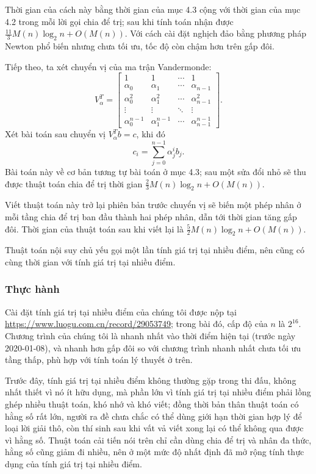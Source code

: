 \documentclass[11pt]{article}
\begin{document}
Thời gian của cách này bằng thời gian của mục 4.3 cộng với thời gian của mục
4.2 trong mỗi lời gọi chia để trị; sau khi tính toán nhận được
\(\frac{11}{3}M(n)\log_2 n+O(M(n))\). Với cách cài đặt nghịch đảo bằng phương
pháp Newton phổ biến nhưng chưa tối ưu, tốc độ còn chậm hơn trên gấp đôi.

Tiếp theo, ta xét chuyển vị của ma trận Vandermonde:
\[
V_\alpha^T=
\begin{bmatrix}
1 & 1 & \cdots & 1\\
\alpha_0 & \alpha_1 & \cdots & \alpha_{n-1}\\
\alpha_0^2 & \alpha_1^2 & \cdots & \alpha_{n-1}^2\\
\vdots & \vdots & \ddots & \vdots\\
\alpha_0^{n-1} & \alpha_1^{n-1} & \cdots & \alpha_{n-1}^{n-1}
\end{bmatrix}.
\]
Xét bài toán sau chuyển vị \(V_\alpha^Tb=c\), khi đó
\[
  c_i=\sum_{j=0}^{n-1}\alpha_j^i b_j.
\]
Bài toán này về cơ bản tương tự bài toán ở mục 4.3; sau một sửa đổi nhỏ sẽ thu
được thuật toán chia để trị thời gian
\(\frac23M(n)\log_2 n+O(M(n))\).

Viết thuật toán này trở lại phiên bản trước chuyển vị sẽ biến một phép nhân ở
mỗi tầng chia để trị ban đầu thành hai phép nhân, dẫn tới thời gian tăng gấp
đôi. Thời gian của thuật toán sau khi viết lại là
\(\frac52M(n)\log_2 n+O(M(n))\).

Thuật toán nội suy chủ yếu gọi một lần tính giá trị tại nhiều điểm, nên cũng có
cùng thời gian với tính giá trị tại nhiều điểm.

\subsubsection{Thực hành}

Cài đặt tính giá trị tại nhiều điểm của chúng tôi được nộp tại
\url{https://www.luogu.com.cn/record/29053749}; trong bài đó, cấp độ của \(n\)
là \(2^{16}\). Chương trình của chúng tôi là nhanh nhất vào thời điểm hiện tại
(trước ngày 2020-01-08), và nhanh hơn gấp đôi so với chương trình nhanh
nhất chưa tối ưu tầng thấp, phù hợp với tính toán lý thuyết ở trên.

Trước đây, tính giá trị tại nhiều điểm không thường gặp trong thi đấu, không
nhất thiết vì nó ít hữu dụng, mà phần lớn vì tính giá trị tại nhiều điểm phải
lồng ghép nhiều thuật toán, khó nhớ và khó viết; đồng thời bản thân thuật toán
có hằng số rất lớn, người ra đề chưa chắc có thể dùng giới hạn thời gian hợp lý
để loại lời giải thô, còn thí sinh sau khi vất vả viết xong lại có thể không
qua được vì hằng số. Thuật toán cải tiến nói trên chỉ cần dùng chia để trị và
nhân đa thức, hằng số cũng giảm đi nhiều, nên ở một mức độ nhất định đã mở rộng
tính thực dụng của tính giá trị tại nhiều điểm.
\end{document}
